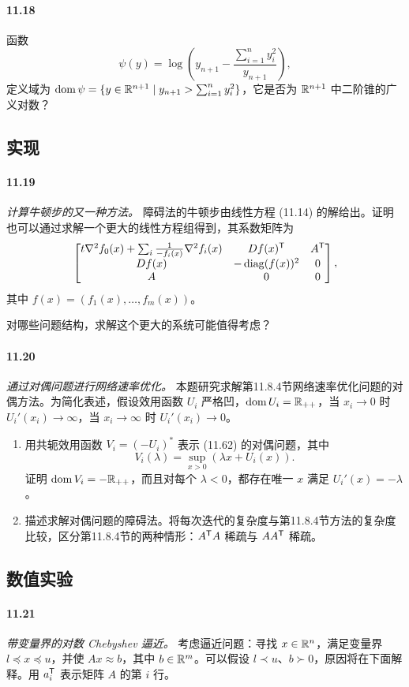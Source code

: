 \paragraph{11.18} 函数
\[
\psi(y)=\log\left(y_{n+1}-\frac{\sum_{i=1}^n y_i^2}{y_{n+1}}\right),
\]
定义域为 $\operatorname{dom}\psi=\{y\in\mathbb R^{n+1}\mid y_{n+1}>\sum_{i=1}^n y_i^2\}$，它是否为 $\mathbb R^{n+1}$ 中二阶锥的广义对数？

\subsection*{实现}
\paragraph{11.19} \emph{计算牛顿步的又一种方法。} 障碍法的牛顿步由线性方程 (11.14) 的解给出。证明也可以通过求解一个更大的线性方程组得到，其系数矩阵为
\[
\begin{bmatrix}
t\nabla^2 f_0(x)+\sum_i\frac1{-f_i(x)}\nabla^2 f_i(x)&Df(x)^\mathsf T&A^\mathsf T\\
Df(x)&-\operatorname{diag}(f(x))^2&0\\
A&0&0
\end{bmatrix},
\]
其中 $f(x)=(f_1(x),\ldots,f_m(x))$。

对哪些问题结构，求解这个更大的系统可能值得考虑？

\paragraph{11.20} \emph{通过对偶问题进行网络速率优化。} 本题研究求解第11.8.4节网络速率优化问题的对偶方法。为简化表述，假设效用函数 $U_i$ 严格凹，$\operatorname{dom} U_i=\mathbb R_{++}$，当 $x_i\to0$ 时 $U_i'(x_i)\to\infty$，当 $x_i\to\infty$ 时 $U_i'(x_i)\to0$。
\begin{enumerate}
\item[(a)] 用共轭效用函数 $V_i=(-U_i)^*$ 表示 (11.62) 的对偶问题，其中
\[
V_i(\lambda)=\sup_{x>0}(\lambda x+U_i(x)).
\]
证明 $\operatorname{dom} V_i=-\mathbb R_{++}$，而且对每个 $\lambda<0$，都存在唯一 $x$ 满足 $U_i'(x)=-\lambda$。
\item[(b)] 描述求解对偶问题的障碍法。将每次迭代的复杂度与第11.8.4节方法的复杂度比较，区分第11.8.4节的两种情形：$A^\mathsf T A$ 稀疏与 $AA^\mathsf T$ 稀疏。
\end{enumerate}

\subsection*{数值实验}
\paragraph{11.21} \emph{带变量界的对数 Chebyshev 逼近。} 考虑逼近问题：寻找 $x\in\mathbb R^n$，满足变量界 $l\preceq x\preceq u$，并使 $Ax\approx b$，其中 $b\in\mathbb R^m$。可以假设 $l\prec u$、$b\succ0$，原因将在下面解释。用 $a_i^\mathsf T$ 表示矩阵 $A$ 的第 $i$ 行。


